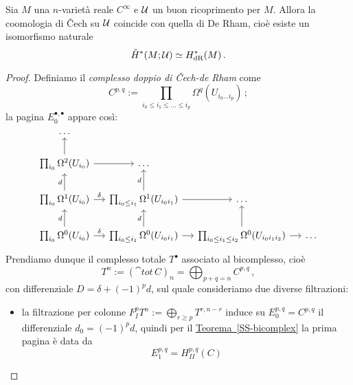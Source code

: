 \begin{ex!}
	\begin{thm}
		Sia $M$ una $n$-varietà reale $C^{\infty}$ e $\mathcal{U}$ un buon ricoprimento per $M$.
		Allora la coomologia di \v{C}ech su $\mathcal{U}$ coincide con quella di De Rham,
		cioè esiste un isomorfismo naturale
		\begin{equation*}
			\check{H}^{*}(M;\mathcal{U}) \simeq H^{*}_{\mathrm{dR}}(M)\,.
		\end{equation*} 
		\begin{proof}
			Definiamo il \emph{complesso doppio di \v{C}ech-de Rham} come
			\begin{equation*}
				C^{p,q} := \prod_{i_{0} \le i_{1} \le \dots \le i_{p}} \Omega^{q}(U_{i_{0} \dots i_{p}})\,;
			\end{equation*}
			la pagina $E_{0}^{\bullet, \bullet}$ appare così:
			\begin{equation*}
				\begin{tikzcd}[column sep=small]
					\dots & & & \\
					\prod_{i_{0}} \Omega^{2}(U_{i_{0}}) \ar[r] \ar[u]
					&  \dots & & \\
					\prod_{i_{0}} \Omega^{1}(U_{i_{0}}) \ar[r, "\delta"] \ar[u, "d"] 
					& \prod_{i_{0} \le i_{1}} \Omega^{1}(U_{i_{0} i_{1}})  \ar[u, "d"] \ar[r] & \dots  & \\
					\prod_{i_{0}} \Omega^{0}(U_{i_{0}}) \ar[r, "\delta"] \ar[u, "d"] 
					& \prod_{i_{0} \le i_{1}} \Omega^{0}(U_{i_{0} i_{1}})  \ar[u, "d"] \ar[r] & 
					\prod_{i_{0} \le i_{1} \le i_{2}} \Omega^{0}(U_{i_{0} i_{1} i_{2}})  
					\ar[u] \ar[r] & \dots
				\end{tikzcd}
			\end{equation*}
			Prendiamo dunque il complesso totale $T^{\bullet}$ associato al bicomplesso,
			cioè
			\begin{equation*}
				T^{n} := (\cat{tot} \, C)_{n} = \bigoplus_{p+q=n} C^{p,q}\,,
			\end{equation*}
			con differenziale $D = \delta + (-1)^{p}d$, sul quale consideriamo due
			diverse filtrazioni:
			\begin{itemize}
				\item la filtrazione per colonne 
				$F^{p}_{I}T^{n} := \bigoplus_{r \ge p} T^{r,n-r}$
				induce su $E_{0}^{p,q} = C^{p,q}$ il
				differenziale $d_{0} = (-1)^{p}d$, quindi per
				il \hyperref[SS-bicomplex]{Teorema~\ref{SS-bicomplex}}
				la prima pagina è data da
				\begin{equation*}
				E_{1}^{p,q} 
				= H_{II}^{p,q}(C) 

\end{equation*}
\end{itemize}
\end{proof}
\end{thm}
\end{ex!}
